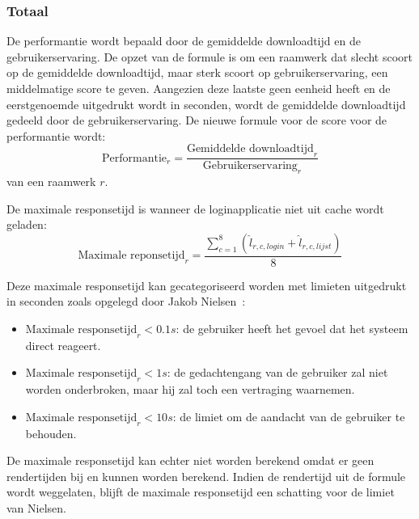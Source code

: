 \subsubsection{Totaal}
De performantie wordt bepaald door de gemiddelde downloadtijd en de gebruikerservaring.
De opzet van de formule is om een raamwerk dat slecht scoort op de gemiddelde downloadtijd, maar sterk scoort op gebruikerservaring, een middelmatige score te geven.
Aangezien deze laatste geen eenheid heeft en de eerstgenoemde uitgedrukt wordt in seconden, wordt de gemiddelde downloadtijd gedeeld door de gebruikerservaring. De nieuwe formule voor de score voor de performantie wordt:
\begin{equation}
  \text{Performantie}_r = \frac{\text{Gemiddelde downloadtijd}_r}{\text{Gebruikerservaring}_r}
  \label{eq:performantie-enhanced}
\end{equation}
van een raamwerk $r$. 


De maximale responsetijd is wanneer de loginapplicatie niet uit cache wordt geladen:
\begin{equation}
  \text{Maximale reponsetijd}_r= \frac{\sum\limits_{c=1}^{8}\left(\widehat{l}_{r,c,login} + \widehat{l}_{r,c,lijst}\right)}{8}
  \label{eq:performantie-max}
\end{equation}

Deze maximale responsetijd kan gecategoriseerd worden met limieten uitgedrukt in seconden zoals opgelegd door Jakob Nielsen~\cite{Nielsen1993}:  
\begin{itemize}
\item $\text{Maximale responsetijd}_r < 0.1\unit{s}$: de gebruiker heeft het gevoel dat het systeem direct reageert.
\item $\text{Maximale responsetijd}_r < 1\unit{s}$: de gedachtengang van de gebruiker zal niet worden onderbroken, maar hij zal toch een vertraging waarnemen.
\item $\text{Maximale responsetijd}_r < 10\unit{s}$: de limiet om de aandacht van de gebruiker te behouden.
\end{itemize}

De maximale responsetijd kan echter niet worden berekend omdat er geen rendertijden bij \st{} en \lungo{} kunnen worden berekend.
Indien de rendertijd uit de formule wordt weggelaten,  blijft de maximale responsetijd een schatting voor de limiet van Nielsen.

